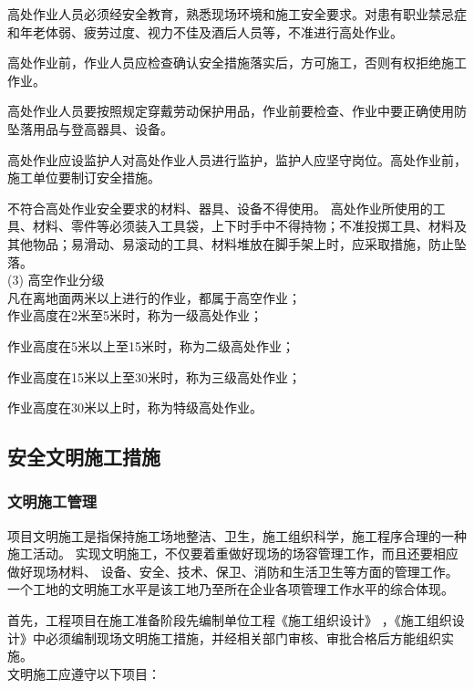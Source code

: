  高处作业人员必须经安全教育，熟悉现场环境和施工安全要求。对患有职业禁忌症和年老体弱、疲劳过度、视力不佳及酒后人员等，不准进行高处作业。

 高处作业前，作业人员应检查确认安全措施落实后，方可施工，否则有权拒绝施工作业。

 高处作业人员要按照规定穿戴劳动保护用品，作业前要检查、作业中要正确使用防坠落用品与登高器具、设备。 

 高处作业应设监护人对高处作业人员进行监护，监护人应坚守岗位。高处作业前，施工单位要制订安全措施。

 不符合高处作业安全要求的材料、器具、设备不得使用。
高处作业所使用的工具、材料、零件等必须装入工具袋，上下时手中不得持物；不准投掷工具、材料及其他物品；易滑动、易滚动的工具、材料堆放在脚手架上时，应采取措施，防止坠落。\\

(3) 高空作业分级\\

凡在离地面两米以上进行的作业，都属于高空作业；\\

 作业高度在2米至5米时，称为一级高处作业；

 作业高度在5米以上至15米时，称为二级高处作业；

 作业高度在15米以上至30米时，称为三级高处作业；

 作业高度在30米以上时，称为特级高处作业。\\

\subsection{安全文明施工措施}
\subsubsection{文明施工管理}

项目文明施工是指保持施工场地整洁、卫生，施工组织科学，施工程序合理的一种施工活动。
实现文明施工，不仅要着重做好现场的场容管理工作，而且还要相应做好现场材料、
设备、安全、技术、保卫、消防和生活卫生等方面的管理工作。
一个工地的文明施工水平是该工地乃至所在企业各项管理工作水平的综合体现。

首先，工程项目在施工准备阶段先编制单位工程《施工组织设计》
，《施工组织设计》中必须编制现场文明施工措施，并经相关部门审核、审批合格后方能组织实施。\\

文明施工应遵守以下项目：

